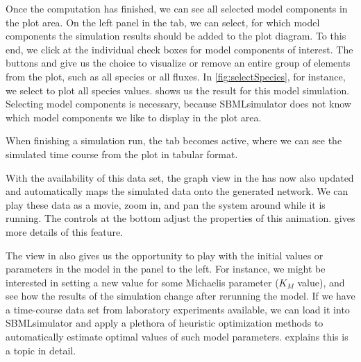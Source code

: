 Once the computation has finished, we can see all selected model components in the plot area.
On the left panel in the  tab, we can select, for which model components the simulation results should be added to the plot diagram.
To this end, we click at the individual check boxes for model components of interest.
The buttons  and  give us the choice to visualize or remove an entire group of elements from the plot, such as all species or all fluxes.
In \cref{fig:selectSpecies}, for instance, we select to plot all species values.
 shows us the result for this model simulation.
Selecting model components is necessary, because SBMLsimulator does not know which model components we like to display in the plot area.

When finishing a simulation run, the tab  becomes active, where we can see the simulated time course from the plot in tabular format.

With the availability of this data set, the graph view in the  has now also updated and automatically maps the simulated data onto the generated network.
We can play these data as a movie, zoom in, and pan the system around while it is running.
The controls at the bottom adjust the properties of this animation.
 gives more details of this feature.

The view in  also gives us the opportunity to play with the initial values or parameters in the model in the panel to the left.
For instance, we might be interested in setting a new value for some Michaelis parameter ($K_M$ value), and see how the results of the simulation change after rerunning the model.
If we have a time-course data set from laboratory experiments available, we can load it into SBMLsimulator and apply a plethora of heuristic optimization methods to automatically estimate optimal values of such model parameters.
 explains this is a topic in detail.

